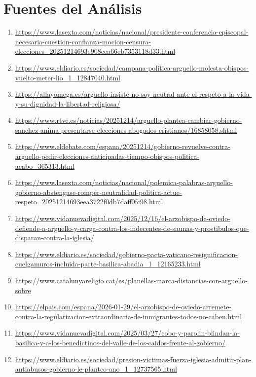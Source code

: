\documentclass[10pt,a4paper]{article}
\begin{document}
\section*{Fuentes del Análisis}
    \begin{enumerate}[leftmargin=*]
            \item \url{ https://www.lasexta.com/noticias/nacional/presidente-conferencia-episcopal-necesaria-cuestion-confianza-mocion-censura-elecciones\_20251214693e908cea66eb7353118d33.html }
            \item \url{ https://www.eldiario.es/sociedad/campana-politica-arguello-molesta-obispos-vuelto-meter-lio\_1\_12847040.html }
            \item \url{ https://alfayomega.es/arguello-insiste-no-soy-neutral-ante-el-respeto-a-la-vida-y-su-dignidad-la-libertad-religiosa/ }
            \item \url{ https://www.rtve.es/noticias/20251214/arguello-plantea-cambiar-gobierno-sanchez-anima-presentarse-elecciones-abogados-cristianos/16858058.shtml }
            \item \url{ https://www.eldebate.com/espana/20251214/gobierno-revuelve-contra-arguello-pedir-elecciones-anticipadas-tiempo-obispos-politica-acabo\_365313.html }
            \item \url{ https://www.lasexta.com/noticias/nacional/polemica-palabras-arguello-gobierno-abstengase-romper-neutralidad-politica-actue-respeto\_20251214693eea3722f0db7daff0fc98.html }
            \item \url{ https://www.vidanuevadigital.com/2025/12/16/el-arzobispo-de-oviedo-defiende-a-arguello-y-carga-contra-los-indecentes-de-saunas-y-prostibulos-que-disparan-contra-la-iglesia/ }
            \item \url{ https://www.eldiario.es/sociedad/gobierno-pacta-vaticano-resignificacion-cuelgamuros-incluida-parte-basilica-abadia\_1\_12165233.html }
            \item \url{ https://www.catalunyareligio.cat/es/planellas-marca-distancias-con-arguello-sobre }
            \item \url{ https://elpais.com/espana/2026-01-29/el-arzobispo-de-oviedo-arremete-contra-la-regularizacion-extraordinaria-de-inmigrantes-todos-no-caben.html }
            \item \url{ https://www.vidanuevadigital.com/2025/03/27/cobo-y-parolin-blindan-la-basilica-y-a-los-benedictinos-del-valle-de-los-caidos-frente-al-gobierno/ }
            \item \url{ https://www.eldiario.es/sociedad/presion-victimas-fuerza-iglesia-admitir-plan-antiabusos-gobierno-le-planteo-ano\_1\_12737565.html }

\end{enumerate}
\end{document}
